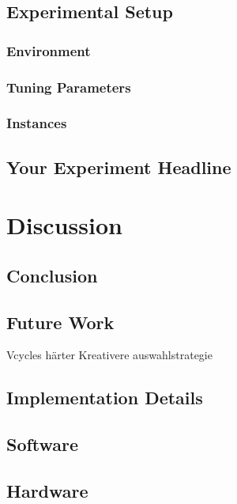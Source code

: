 \documentclass[a4paper,12pt,bibtotoc,titlepage, liststotoc,BCOR7mm,headsepline,pointlessnumbers]{scrbook}
\numberwithin{equation}{section}
\begin{document}
\section{Experimental Setup}
\subsection{Environment}
\subsection{Tuning Parameters}
\subsection{Instances}
\section{Your Experiment Headline}
\chapter{Discussion}
\section{Conclusion}
\section{Future Work}
Vcycles härter
Kreativere auswahlstrategie

\clearpage
\begin{appendix}
\chapter{Implementation Details}
\section{Software}
\section{Hardware}
\end{appendix}


\end{document}
